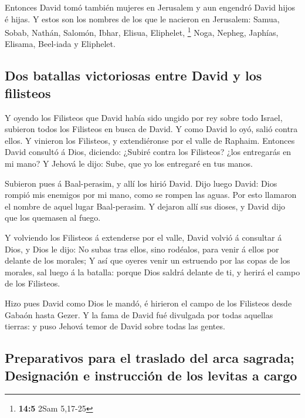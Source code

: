  Entonces David tomó también mujeres en Jerusalem y aun
engendró David hijos é hijas.  Y estos son los nombres de
los que le nacieron en Jerusalem: Samua, Sobab, Nathán, Salomón,
 Ibhar, Elisua, Eliphelet, \footnote{\textbf{14:5} 2Sam
  5,17-25}  Noga, Nepheg, Japhías,  Elisama,
Beel-iada y Eliphelet.

\hypertarget{dos-batallas-victoriosas-entre-david-y-los-filisteos}{%
\subsection{Dos batallas victoriosas entre David y los
filisteos}\label{dos-batallas-victoriosas-entre-david-y-los-filisteos}}

 Y oyendo los Filisteos que David había sido ungido por
rey sobre todo Israel, subieron todos los Filisteos en busca de David. Y
como David lo oyó, salió contra ellos.  Y vinieron los
Filisteos, y extendiéronse por el valle de Raphaim. 
Entonces David consultó á Dios, diciendo: ¿Subiré contra los Filisteos?
¿los entregarás en mi mano? Y Jehová le dijo: Sube, que yo los entregaré
en tus manos.

 Subieron pues á Baal-perasim, y allí los hirió David.
Dijo luego David: Dios rompió mis enemigos por mi mano, como se rompen
las aguas. Por esto llamaron el nombre de aquel lugar Baal-perasim.
 Y dejaron allí sus dioses, y David dijo que los quemasen
al fuego.

 Y volviendo los Filisteos á extenderse por el valle,
 David volvió á consultar á Dios, y Dios le dijo: No
subas tras ellos, sino rodéalos, para venir á ellos por delante de los
morales;  Y así que oyeres venir un estruendo por las
copas de los morales, sal luego á la batalla: porque Dios saldrá delante
de ti, y herirá el campo de los Filisteos.

 Hizo pues David como Dios le mandó, é hirieron el campo
de los Filisteos desde Gabaón hasta Gezer.  Y la fama de
David fué divulgada por todas aquellas tierras: y puso Jehová temor de
David sobre todas las gentes.

\hypertarget{preparativos-para-el-traslado-del-arca-sagrada-designaciuxf3n-e-instrucciuxf3n-de-los-levitas-a-cargo}{%
\subsection{Preparativos para el traslado del arca sagrada; Designación
e instrucción de los levitas a
cargo}\label{preparativos-para-el-traslado-del-arca-sagrada-designaciuxf3n-e-instrucciuxf3n-de-los-levitas-a-cargo}}

